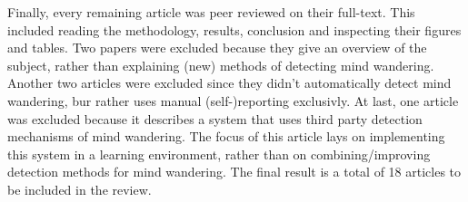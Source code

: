 Finally, every remaining article was peer reviewed on their full-text. This included reading the methodology, results, conclusion and inspecting their figures and tables.
Two papers were excluded because they give an overview of the subject, rather than explaining (new) methods of detecting mind wandering. 
Another two articles were excluded since they didn't automatically detect mind wandering, bur rather uses manual (self-)reporting exclusivly.
At last, one article was excluded because it describes a system that uses third party detection mechanisms of mind wandering. The focus of this article lays on implementing this system in a learning environment, rather than on combining/improving detection methods for mind wandering.
The final result is a total of 18 articles to be included in the review.

